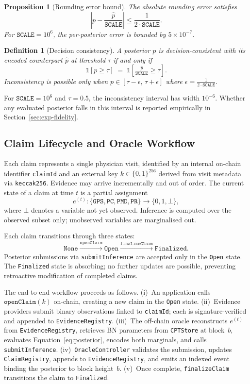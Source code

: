 \documentclass[journal]{IEEEtran}
\newtheorem{definition}{Definition}
\newtheorem{proposition}{Proposition}
\begin{document}
\begin{proposition}[Rounding error bound]
The absolute rounding error satisfies
\[
  \left|p - \frac{\widehat{p}}{\texttt{SCALE}}\right|
  \leq \frac{1}{2\cdot\texttt{SCALE}}.
\]
For $\texttt{SCALE}=10^6$, the per-posterior error is
bounded by $5\times10^{-7}$.
\end{proposition}

\begin{definition}[Decision consistency]
A posterior $p$ is \emph{decision-consistent} with its
encoded counterpart $\widehat{p}$ at threshold $\tau$
if and only if
\[
  \mathbb{1}[p \geq \tau]
  \;=\;
  \mathbb{1}\!\left[
    \tfrac{\widehat{p}}{\texttt{SCALE}} \geq \tau
  \right].
\]
Inconsistency is possible only when
$p\in[\tau-\epsilon,\,\tau+\epsilon]$ where
$\epsilon = \frac{1}{2\cdot\texttt{SCALE}}$.
\end{definition}

For $\texttt{SCALE}=10^6$ and $\tau=0.5$, the
inconsistency interval has width $10^{-6}$.
Whether any evaluated posterior falls in this interval
is reported empirically in
Section~\ref{sec:exp-fidelity}.

\subsection{Claim Lifecycle and Oracle Workflow}

Each claim represents a single physician visit,
identified by an internal on-chain identifier
\texttt{claimId} and an external key
$k\in\{0,1\}^{256}$ derived from visit metadata via
\texttt{keccak256}.
Evidence may arrive incrementally and out of order.
The current state of a claim at time $t$ is a partial
assignment
\[
  e^{(t)}:
  \{\texttt{GPS},\texttt{PC},\texttt{PMD},\texttt{PR}\}
  \rightarrow\{0,1,\bot\},
\]
where $\bot$ denotes a variable not yet observed.
Inference is computed over the observed subset only;
unobserved variables are marginalised out.

Each claim transitions through three states:
\[
  \texttt{None}
  \xrightarrow{\texttt{openClaim}}
  \texttt{Open}
  \xrightarrow{\texttt{finalizeClaim}}
  \texttt{Finalized}.
\]
Posterior submissions via \texttt{submitInference} are
accepted only in the \texttt{Open} state.
The \texttt{Finalized} state is absorbing; no further
updates are possible, preventing retroactive
modification of completed claims.

The end-to-end workflow proceeds as follows.
(i)~An application calls $\texttt{openClaim}(k)$
on-chain, creating a new claim in the \texttt{Open}
state.
(ii)~Evidence providers submit binary observations
linked to \texttt{claimId}; each is signature-verified
and appended to \texttt{EvidenceRegistry}.
(iii)~The off-chain oracle reconstructs $e^{(t)}$
from \texttt{EvidenceRegistry}, retrieves BN
parameters from \texttt{CPTStore} at block~$b$,
evaluates Equation~\eqref{eq:posterior}, encodes both
marginals, and calls \texttt{submitInference}.
(iv)~\texttt{OracleController} validates the
submission, updates \texttt{ClaimRegistry}, appends to
\texttt{EvidenceRegistry}, and emits an indexed event
binding the posterior to block height~$b$.
(v)~Once complete, \texttt{finalizeClaim} transitions
the claim to \texttt{Finalized}.
\end{document}
